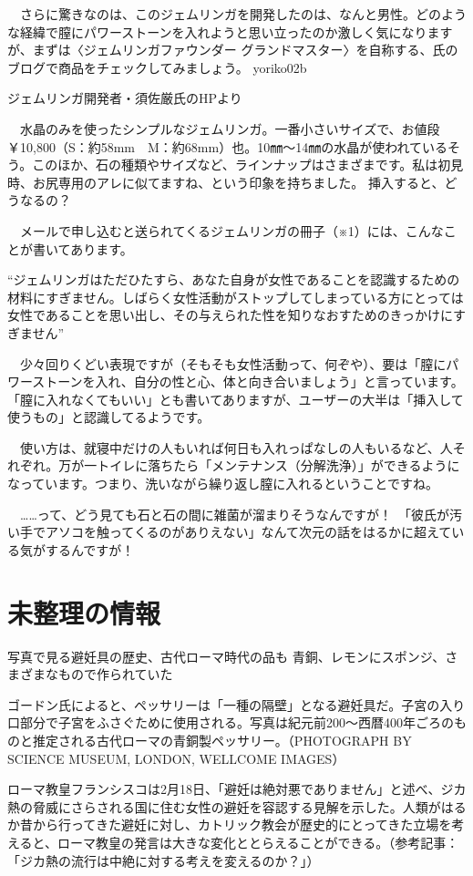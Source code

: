　さらに驚きなのは、このジェムリンガを開発したのは、なんと男性。どのような経緯で膣にパワーストーンを入れようと思い立ったのか激しく気になりますが、まずは〈ジェムリンガファウンダー グランドマスター〉を自称する、氏のブログで商品をチェックしてみましょう。
yoriko02b

ジェムリンガ開発者・須佐厳氏のHPより

　水晶のみを使ったシンプルなジェムリンガ。一番小さいサイズで、お値段￥10,800（S：約58mm　M：約68mm）也。10㎜～14㎜の水晶が使われているそう。このほか、石の種類やサイズなど、ラインナップはさまざまです。私は初見時、お尻専用のアレに似てますね、という印象を持ちました。
挿入すると、どうなるの？

　メールで申し込むと送られてくるジェムリンガの冊子（※1）には、こんなことが書いてあります。

“ジェムリンガはただひたすら、あなた自身が女性であることを認識するための材料にすぎません。しばらく女性活動がストップしてしまっている方にとっては女性であることを思い出し、その与えられた性を知りなおすためのきっかけにすぎません”

　少々回りくどい表現ですが（そもそも女性活動って、何ぞや）、要は「膣にパワーストーンを入れ、自分の性と心、体と向き合いましょう」と言っています。「膣に入れなくてもいい」とも書いてありますが、ユーザーの大半は「挿入して使うもの」と認識してるようです。

　使い方は、就寝中だけの人もいれば何日も入れっぱなしの人もいるなど、人それぞれ。万が一トイレに落ちたら「メンテナンス（分解洗浄）」ができるようになっています。つまり、洗いながら繰り返し膣に入れるということですね。

　……って、どう見ても石と石の間に雑菌が溜まりそうなんですが！　「彼氏が汚い手でアソコを触ってくるのがありえない」なんて次元の話をはるかに超えている気がするんですが！


\section{未整理の情報}
写真で見る避妊具の歴史、古代ローマ時代の品も
青銅、レモンにスポンジ、さまざまなもので作られていた

ゴードン氏によると、ペッサリーは「一種の隔壁」となる避妊具だ。子宮の入り口部分で子宮をふさぐために使用される。写真は紀元前200～西暦400年ごろのものと推定される古代ローマの青銅製ペッサリー。（PHOTOGRAPH BY SCIENCE MUSEUM, LONDON, WELLCOME IMAGES）

ローマ教皇フランシスコは2月18日、「避妊は絶対悪でありません」と述べ、ジカ熱の脅威にさらされる国に住む女性の避妊を容認する見解を示した。人類がはるか昔から行ってきた避妊に対し、カトリック教会が歴史的にとってきた立場を考えると、ローマ教皇の発言は大きな変化ととらえることができる。（参考記事：「ジカ熱の流行は中絶に対する考えを変えるのか？」）

